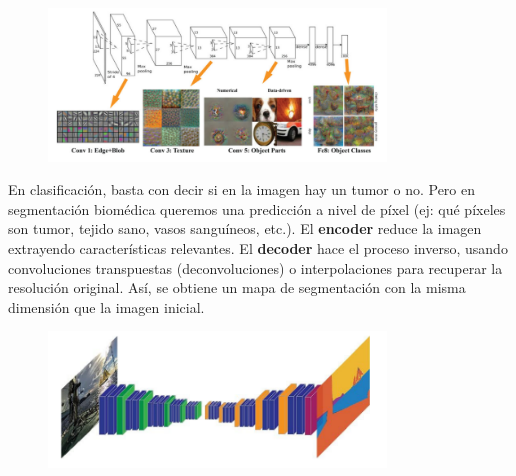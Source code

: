\begin{figure}[h]
\centering
\includegraphics[width = 0.8\textwidth]{figs/convolutions.png}
\end{figure}

En clasificación, basta con decir si en la imagen hay un tumor o no. Pero en segmentación biomédica queremos una predicción a nivel de píxel (ej: qué píxeles son tumor, tejido sano, vasos sanguíneos, etc.). El \textbf{encoder} reduce la imagen extrayendo características relevantes. El \textbf{decoder} hace el proceso inverso, usando convoluciones transpuestas (deconvoluciones) o interpolaciones para recuperar la resolución original. Así, se obtiene un mapa de segmentación con la misma dimensión que la imagen inicial.

\begin{figure}[h]
\centering
\includegraphics[width = 0.8\textwidth]{figs/encoder-decoder.png}
\end{figure}
